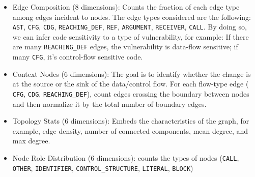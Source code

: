 \begin{itemize}
\begin{itemize}
        \item \texttt{deref\_nodes}: IDENTIFIER nodes matching \texttt{\textbackslash*\textbackslash w|->} (pointer dereferences)
        \item \texttt{check\_nodes}: CONTROL\_STRUCTURE nodes matching \texttt{(if | assert | BUG\_ON | WARN\_ON | check)} or NULL checks
    \end{itemize}
    \item Edge Composition (8 dimensions): Counts the fraction of each edge type among edges incident to nodes. The edge types considered are the following: \texttt{AST}, \texttt{CFG}, \texttt{CDG}, \texttt{REACHING\_DEF}, \texttt{REF}, \texttt{ARGUMENT}, \texttt{RECEIVER}, \texttt{CALL}. By doing so, we can infer code sensitivity to a type of vulnerability, for example:  If there are many \texttt{REACHING\_DEF} edges, the vulnerability is data-flow sensitive; if many \texttt{CFG}, it's control-flow sensitive code.
    
    
    \item Context Nodes (6 dimensions): The goal is to identify whether the change is at the source or the sink of the data/control flow. For each flow-type edge ( \texttt{CFG}, \texttt{CDG}, \texttt{REACHING\_DEF}), count edges crossing the boundary between nodes and then normalize it by the total number of boundary edges.
    
    
    \item Topology Stats (6 dimensions): Embeds the characteristics of the graph, for example, edge density, number of connected components, mean degree, and max degree.
    
    \item Node Role Distribution (6 dimensions): counts the types of nodes (\texttt{CALL}, \texttt{OTHER}, \texttt{IDENTIFIER}, \texttt{CONTROL\_STRUCTURE}, \texttt{LITERAL}, \texttt{BLOCK})
\end{itemize}



